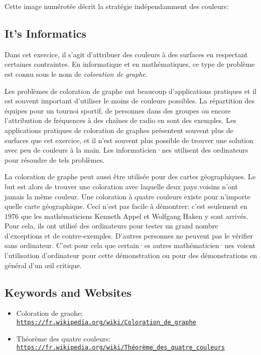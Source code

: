 \documentclass[a4paper,11pt]{report}
\newcommand{\BrochureUrlText}[1]{\texttt{#1}}
\newcommand{\taskGraphicsFolder}{..}
\begin{document}
Cette image numérotée décrit la stratégie indépendamment des couleurs:

{\centering%
\par}


\subsection*{It’s Informatics}

Dans cet exercice, il s’agit d’attribuer des couleurs à des surfaces en respectant certaines contraintes. En informatique et en mathématiques, ce type de problème est connu sous le nom de \emph{coloration de graphe}.

Les problèmes de coloration de graphe ont beaucoup d’applications pratiques et il est souvent important d’utiliser le moins de couleurs possibles. La répartition des équipes pour un tournoi sportif, de personnes dans des groupes ou encore l’attribution de fréquences à des chaînes de radio en sont des exemples. Les applications pratiques de coloration de graphes présentent souvent plus de surfaces que cet exercice, et il n’est souvent plus possible de trouver une solution avec peu de couleurs à la main. Les informaticien·nes utilisent des ordinateurs pour résoudre de tels problèmes.

La coloration de graphe peut aussi être utilisée pour des cartes géographiques. Le but est alors de trouver une coloration avec laquelle deux pays voisins n’ont jamais la même couleur. Une coloration à quatre couleurs existe pour n’importe quelle carte géographique. Ceci n’est pas facile à démontrer: c’est seulement en $1976$ que les mathématiciens Kenneth Appel et Wolfgang Haken y sont arrivés. Pour cela, ils ont utilisé des ordinateurs pour tester un grand nombre d’exceptions et de contre-exemples. D’autres personnes ne peuvent pas le vérifier sans ordinateur. C’est pour cela que certain·es autres mathématicien·nes voient l’utilisation d’ordinateur pour cette démonstration ou pour des démonstrations en général d’un œil critique.

{\raggedright

\subsection*{Keywords and Websites}

\begin{itemize}
  \item Coloration de graohe: \href{https://fr.wikipedia.org/wiki/Coloration_de_graphe}{\BrochureUrlText{https://fr.wikipedia.org/wiki/Coloration\_de\_graphe}}
  \item Théorème des quatre couleurs: \href{https://fr.wikipedia.org/wiki/Th\%C3\%A9or\%C3\%A8me_des_quatre_couleurs}{\BrochureUrlText{https://fr.wikipedia.org/wiki/Théorème\_des\_quatre\_couleurs}}
\end{itemize}


}
\end{document}
